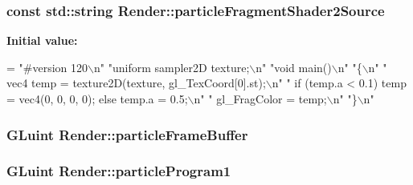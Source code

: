 \subsubsection[{particle\+Fragment\+Shader2\+Source}]{\setlength{\rightskip}{0pt plus 5cm}const std\+::string Render\+::particle\+Fragment\+Shader2\+Source\hspace{0.3cm}{\ttfamily [private]}}\label{classRender_af249c6ab18c7af2bf8342333a8fb49e3}
{\bfseries Initial value\+:}
\begin{DoxyCode}
=
        \textcolor{stringliteral}{"#version 120\(\backslash\)n"}
        \textcolor{stringliteral}{"uniform sampler2D texture;\(\backslash\)n"}
        \textcolor{stringliteral}{"void main()\(\backslash\)n"}
        \textcolor{stringliteral}{"\{\(\backslash\)n"}
        \textcolor{stringliteral}{"   vec4 temp = texture2D(texture, gl\_TexCoord[0].st);\(\backslash\)n"}
        \textcolor{stringliteral}{"   if (temp.a < 0.1) temp = vec4(0, 0, 0, 0); else temp.a = 0.5;\(\backslash\)n"}
        \textcolor{stringliteral}{"   gl\_FragColor = temp;\(\backslash\)n"}
        \textcolor{stringliteral}{"\}\(\backslash\)n"}
\end{DoxyCode}
\hypertarget{classRender_a0d697ea0a45a8948778fcc70d3a86070}{}
\subsubsection[{particle\+Frame\+Buffer}]{\setlength{\rightskip}{0pt plus 5cm}G\+Luint Render\+::particle\+Frame\+Buffer\hspace{0.3cm}{\ttfamily [private]}}\label{classRender_a0d697ea0a45a8948778fcc70d3a86070}
\hypertarget{classRender_a7bf04c329740a17f06ee75b0ecd5aa39}{}
\subsubsection[{particle\+Program1}]{\setlength{\rightskip}{0pt plus 5cm}G\+Luint Render\+::particle\+Program1\hspace{0.3cm}{\ttfamily [private]}}\label{classRender_a7bf04c329740a17f06ee75b0ecd5aa39}
\hypertarget{classRender_ad8abc021db462a304ffbf43af03b8de6}{}
